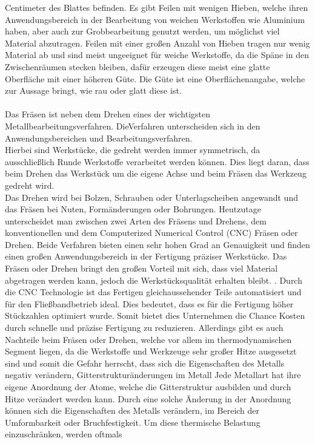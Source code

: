 Centimeter des Blattes befinden. Es gibt Feilen mit wenigen Hieben, welche ihren Anwendungsbereich in der Bearbeitung von weichen Werkstoffen wie 
Aluminium haben, aber auch zur Grobbearbeitung genutzt werden, um möglichst viel Material abzutragen. Feilen mit einer großen Anzahl von Hieben tragen
nur wenig Material ab und sind meist ungeeignet für weiche Werkstoffe, da die Späne in den Zwischenräumen stecken bleiben, dafür erzeugen diese meist eine 
glatte Oberfläche mit einer höheren Güte. Die Güte ist eine Oberflächenangabe, welche zur Aussage bringt, wie rau oder glatt diese ist. \autocite{Forster.2018}
\\\\
Das Fräsen ist neben dem Drehen eines der wichtigsten Metallbearbeitungsverfahren. DieVerfahren unterscheiden sich in den Anwendungsbereichen und 
Bearbeitungsverfahren. 
\\
Hierbei sind Werkstücke, die gedreht werden immer symmetrisch, da ausschließlich Runde Werkstoffe verarbeitet werden können. Dies liegt daran, dass beim 
Drehen das Werkstück um die eigene Achse und beim Fräsen das Werkzeug gedreht wird. 
\\
Das Drehen wird \zB bei Bolzen, Schrauben oder Unterlagscheiben angewandt und das Fräsen bei \zB Nuten, Formänderungen oder Bohrungen. Heutzutage unterscheidet
man zwischen zwei Arten des Fräsens und Drehens, dem konventionellen und dem Computerized Numerical Control (CNC) Fräsen oder Drehen. Beide Verfahren bieten
einen sehr hohen Grad an Genauigkeit und finden einen großen Anwendungsbereich in der Fertigung präziser Werkstücke. Das Fräsen oder Drehen bringt den 
großen Vorteil mit sich, dass viel Material abgetragen werden kann, jedoch die Werkstücksqualität erhalten bleibt. . Durch die CNC Technologie ist das 
Fertigen gleichaussehender Teile automatisiert und für den Fließbandbetrieb ideal. Dies bedeutet, dass es für die Fertigung höher Stückzahlen optimiert 
wurde. Somit bietet dies Unternehmen die Chance Kosten durch schnelle und präzise Fertigung zu reduzieren. Allerdings gibt es auch Nachteile beim Fräsen 
oder Drehen, welche vor allem im thermodynamischen Segment liegen, da die Werkstoffe und Werkzeuge sehr großer Hitze ausgesetzt sind und somit die Gefahr
herrscht, dass sich die Eigenschaften \zB des Metalls negativ verändern, Gitterstrukturänderungen im Metall Jede Metallart hat ihre eigene Anordnung der
Atome, welche die Gitterstruktur ausbilden und durch Hitze verändert werden kann. Durch eine solche Änderung in der Anordnung können sich die 
Eigenschaften des Metalls verändern, \zB im Bereich der Umformbarkeit oder Bruchfestigkeit. Um diese thermische Belastung einzuschränken, werden oftmals 
